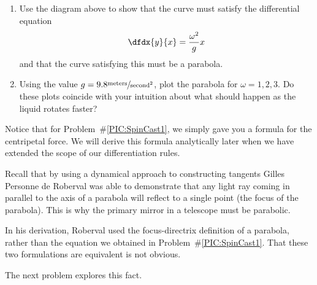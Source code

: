   \begin{embeddedproblem-enumerate}
    \label{PIC:SpinCast1}{}
    \begin{enumerate}[label={\bf{}(\alph*)}]
    \item Use the diagram above to show that the curve must satisfy the
      differential equation
      $$
      \dfdx{y}{x}=\frac{\omega^2}{g} x
      $$
      and that the curve satisfying this must be a parabola.
    \item Using the value
      $g=9.8\sfrac{\text{meters}}{\text{second}^2}$, plot the parabola
      for $\omega{}=1, 2, 3$.  Do these plots coincide with your
      intuition about what should happen as the liquid rotates faster?
    \end{enumerate}
  \end{embeddedproblem-enumerate}

  Notice that for Problem~\#\ref{PIC:SpinCast1}, we simply gave you a
  formula for the centripetal force. We will derive this formula
  analytically later when we have extended the scope of our
  differentiation rules.

  Recall that by using a dynamical approach to constructing tangents
  Gilles Personne de Roberval was able to demonstrate that any light
  ray coming in parallel to the axis of a parabola will reflect to a
  single point (the focus of the parabola).  This is why the primary
  mirror in a telescope must be parabolic.

  In his derivation, Roberval used the focus-directrix definition of a
  parabola, rather than the equation we obtained in
  Problem~\#\ref{PIC:SpinCast1}.  That these two formulations are
  equivalent is not obvious.

  The next problem explores this fact.

